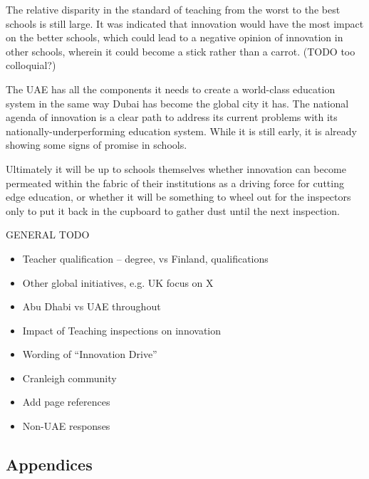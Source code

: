 The relative disparity in the standard of teaching from the worst to the best schools is still large. It was indicated that innovation would have the most impact on the better schools, which could lead to a negative opinion of innovation in other schools, wherein it could become a stick rather than a carrot. (TODO too colloquial?)

The UAE has all the components it needs to create a world-class education system in the same way Dubai has become the global city it has. The national agenda of innovation is a clear path to address its current problems with its nationally-underperforming education system. While it is still early, it is already showing some signs of promise in schools. 

Ultimately it will be up to schools themselves whether innovation can become permeated within the fabric of their institutions as a driving force for cutting edge education, or whether it will be something to wheel out for the inspectors only to put it back in the cupboard to gather dust until the next inspection.

GENERAL TODO
\begin{itemize}
\item Teacher qualification – degree, vs Finland, qualifications
\item Other global initiatives, e.g. UK focus on X
\item Abu Dhabi vs UAE throughout
\item Impact of Teaching inspections on innovation
\item Wording of “Innovation Drive”
\item Cranleigh community
\item Add page references
\item Non-UAE responses

\end{itemize}

\subsection{Appendices}

